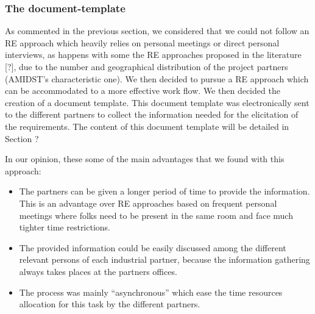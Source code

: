 \documentclass[11pt, oneside]{article}   	%
\begin{document}



\subsubsection*{The document-template}

As commented in the previous section, we considered that we could not follow an RE approach which heavily relies on personal meetings or direct personal interviews, as happens with some the RE approaches proposed in the literature [?], due to the number and geographical distribution of the project partners (AMIDST's characteristic one). We then decided to pursue a RE approach which can be accommodated to a more effective work flow. We then decided the creation of a document template. This document template was electronically  sent to the different partners to collect the information needed for the elicitation of the requirements. The content of this document template will be detailed in Section ?

In our opinion, these some of the main advantages that we found with this approach:

\begin{itemize}
\item  The partners can be given a longer period of time to provide the information. This is an advantage over RE approaches based on frequent personal meetings where folks need to be present in the same room and face much tighter time restrictions. 

\item The provided information could be easily discussed among the different relevant persons of each industrial partner, because the information gathering always takes places at the partners offices.

\item The process was mainly ``asynchronous'' which ease the time resources allocation for this task by the different partners.
\end{itemize}
\end{document}
